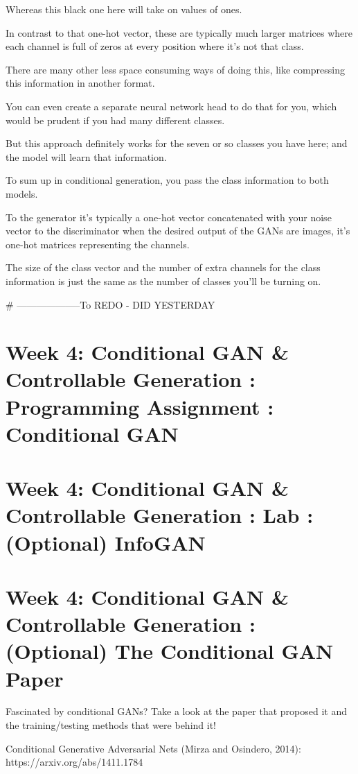 \documentclass[11pt, onecolumn]{article}
\begin{document}
Whereas this black one here will take on values of ones.

In contrast to that one-hot vector, these are typically much larger matrices where each channel is full of zeros at every position where it's not that class.

There are many other less space consuming ways of doing this, like compressing this information in another format.

You can even create a separate neural network head to do that for you, which would be prudent if you had many different classes.

But this approach definitely works for the seven or so classes you have here; and the model will learn that information.

To sum up in conditional generation, you pass the class information to both models.

To the generator it's typically a one-hot vector concatenated with your noise vector to the discriminator when the desired output of the GANs are images, it's one-hot matrices representing the channels.

The size of the class vector and the number of extra channels for the class information is just the same as the number of classes you'll be turning on. 


# --------------------To REDO - DID YESTERDAY


\section{Week 4: Conditional GAN \& Controllable Generation : Programming Assignment : Conditional GAN}


\section{Week 4: Conditional GAN \& Controllable Generation : Lab : (Optional) InfoGAN}


\section{Week 4: Conditional GAN \& Controllable Generation :(Optional) The Conditional GAN Paper}

Fascinated by conditional GANs? Take a look at the paper that proposed it and the training/testing methods that were behind it!

Conditional Generative Adversarial Nets (Mirza and Osindero, 2014): https://arxiv.org/abs/1411.1784
\end{document}
